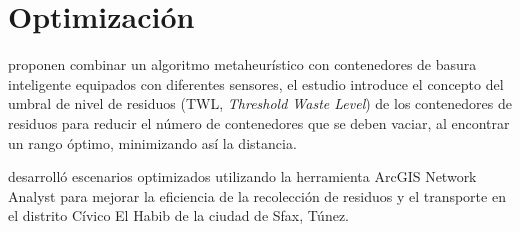 \chapter{Optimización}
\label{chap4}
\ifpdf
  \graphicspath{{Chapter4/Chapter4Figs/PNG/}{Chapter4/Chapter4Figs/PDF/}{Chapter4/Chapter4Figs/}}
\else
  \graphicspath{{Chapter4/Chapter4Figs/EPS/}{Chapter4/Chapter4Figs/}}
\fi



\citet{Akhtar2017BacktrackingOptimization} proponen combinar un algoritmo metaheurístico con contenedores de basura inteligente equipados con diferentes sensores, el estudio introduce el concepto del umbral de nivel de residuos (TWL, \textit{Threshold Waste Level}) de los contenedores de residuos para reducir el número de contenedores que se deben vaciar, al encontrar un rango óptimo, minimizando así la distancia.

\citet{Kallel2016UsingTunisia} desarrolló escenarios optimizados utilizando la herramienta ArcGIS Network Analyst para mejorar la eficiencia de la recolección de residuos y el transporte en el distrito Cívico El Habib de la ciudad de Sfax, Túnez.


